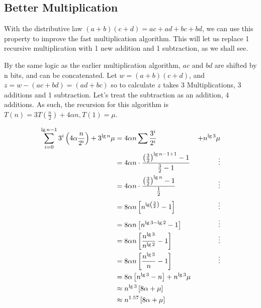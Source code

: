 \documentclass[english, 10pt]{article}
\begin{document}
\subsection{Better Multiplication}

With the distributive law $(a+b)(c+d) = ac + ad + bc + bd$, we can use this property to improve the fast multiplication algorithm.
This will let us replace 1 recursive multiplication with 1 new addition and 1 subtraction, as we shall see.



By the same logic as the earlier multiplication algorithm, $ac$ and $bd$ are
shifted by n bits, and can be concatenated.  Let $w=(a+b)(c+d)$, and $z = w
-(ac + bd) = (ad+bc)$ so to calculate $z$ takes 3 Multiplications, 3 additions
and 1 subtraction. Let's treat the subtraction as an addition, 4 additions.
As such, the recursion for this algorithm is $T(n) = 3T\left( \frac{n}{2} \right)+4\alpha n, T(1) = \mu$.

\begin{align*}
    \sum_{i=0}^{\lg n-1} 3^i \left( 4\alpha \frac{n}{2^i} \right) + 3^{\lg n}\mu &= 4\alpha n \sum \frac{3^i}{2^i} &+n^{\lg 3}\mu \\
    &= 4\alpha n \cdot \frac{{\left(\frac{3}{2} \right)}^{\lg n -1 +1}-1}{\frac{3}{2}-1} &\vdots\\
    &= 4\alpha n \cdot \frac{{\left(\frac{3}{2} \right)}^{\lg n }-1}{\frac{1}{2}}  &\vdots\\
    &= 8\alpha n \left[ n^{\lg \left( \frac{3}{2} \right)}-1 \right]  &\vdots\\
    &= 8\alpha n \left[ n^{\lg 3 - \lg 2}-1 \right]  &\vdots\\
    &= 8\alpha n \left[ \frac{n^{\lg 3}}{n^{\lg 2}}-1 \right]  &\vdots\\
    &= 8\alpha n \left[ \frac{n^{\lg 3}}{n}-1 \right]  &\vdots\\
    &= 8\alpha \left[ {n^{\lg 3}} -n \right] + n^{\lg 3}\mu\\
    &\approx {n^{\lg 3}}\left[ 8\alpha +\mu \right] \\
    &\approx {n^{1.57}}\left[ 8\alpha +\mu \right] \\
\end{align*}
\end{document}
